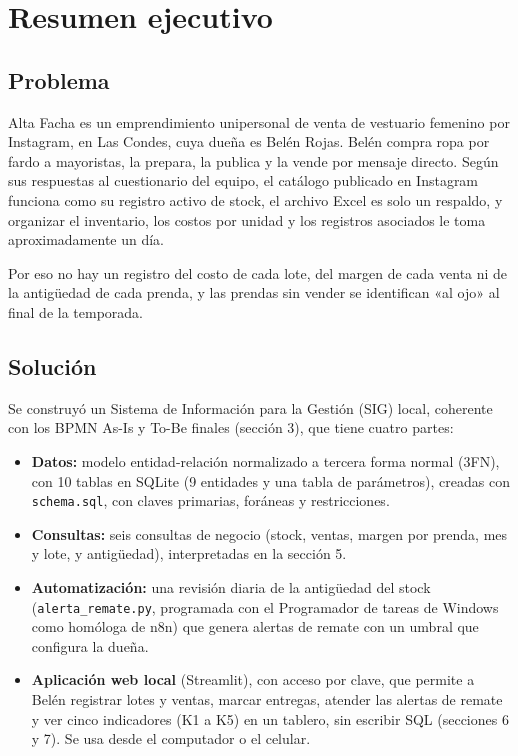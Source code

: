 \documentclass[11pt,letterpaper]{article}
\begin{document}
\section{Resumen ejecutivo}

\subsection{Problema}

Alta Facha es un emprendimiento unipersonal de venta de vestuario femenino por Instagram, en Las Condes, cuya dueña es Belén Rojas. Belén compra ropa por fardo a mayoristas, la prepara, la publica y la vende por mensaje directo. Según sus respuestas al cuestionario del equipo, el catálogo publicado en Instagram funciona como su registro activo de stock, el archivo Excel es solo un respaldo, y organizar el inventario, los costos por unidad y los registros asociados le toma aproximadamente un día.

Por eso no hay un registro del costo de cada lote, del margen de cada venta ni de la antigüedad de cada prenda, y las prendas sin vender se identifican «al ojo» al final de la temporada.

\subsection{Solución}

Se construyó un Sistema de Información para la Gestión (SIG) local, coherente con los BPMN As-Is y To-Be finales (sección 3), que tiene cuatro partes:
\begin{itemize}
\item \textbf{Datos:} modelo entidad-relación normalizado a tercera forma normal (3FN), con 10 tablas en SQLite (9 entidades y una tabla de parámetros), creadas con \texttt{schema.sql}, con claves primarias, foráneas y restricciones.
\item \textbf{Consultas:} seis consultas de negocio (stock, ventas, margen por prenda, mes y lote, y antigüedad), interpretadas en la sección 5.
\item \textbf{Automatización:} una revisión diaria de la antigüedad del stock (\texttt{alerta\_\allowbreak{}remate.py}, programada con el Programador de tareas de Windows como homóloga de n8n) que genera alertas de remate con un umbral que configura la dueña.
\item \textbf{Aplicación web local} (Streamlit), con acceso por clave, que permite a Belén registrar lotes y ventas, marcar entregas, atender las alertas de remate y ver cinco indicadores (K1 a K5) en un tablero, sin escribir SQL (secciones 6 y 7). Se usa desde el computador o el celular.
\end{itemize}
\end{document}
